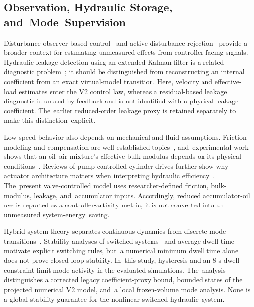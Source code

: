 \documentclass[machines,article,submit,pdftex,moreauthors]{Definitions/mdpi}
\begin{document}
\subsection{Observation, Hydraulic Storage, and~Mode~Supervision}
Disturbance-observer-based control~\cite{chen2016} and active disturbance rejection~\cite{han2009} provide a broader context for estimating unmeasured effects from controller-facing signals. Hydraulic leakage detection using an extended Kalman filter is a related diagnostic problem~\cite{an2005}; it should be distinguished from reconstructing an internal coefficient from an exact virtual-model transition. Here, velocity and effective-load estimates enter the V2 control law, whereas a residual-based leakage diagnostic is unused by feedback and is not identified with a physical leakage coefficient. The~earlier reduced-order leakage proxy is retained separately to make this distinction~explicit.

Low-speed behavior also depends on mechanical and fluid assumptions. Friction modeling and compensation are well-established topics~\cite{wit1995,olsson1998}, and~experimental work shows that an oil--air mixture's effective bulk modulus depends on its physical conditions~\cite{gholizadeh2013}. Reviews of pump-controlled cylinder drives further show why actuator architecture matters when interpreting hydraulic efficiency~\cite{ketelsen2019}. The~present valve-controlled model uses researcher-defined friction, bulk-modulus, leakage, and~accumulator inputs. Accordingly, reduced accumulator-oil use is reported as a controller-activity metric; it is not converted into an unmeasured system-energy~saving.

Hybrid-system theory separates continuous dynamics from discrete mode transitions~\cite{goebel2009}. Stability analyses of switched systems~\cite{liberzon1999} and average dwell time~\cite{hespanha1999} motivate explicit switching rules, but~a numerical minimum dwell time alone does not prove closed-loop stability. In~this study, hysteresis and an 8 s dwell constraint limit mode activity in the evaluated simulations. The~analysis distinguishes a corrected legacy coefficient-proxy bound, bounded states of the projected numerical V2 model, and~a local frozen-volume mode analysis. None is a global stability guarantee for the nonlinear switched \mbox{hydraulic~system}.
\end{document}
